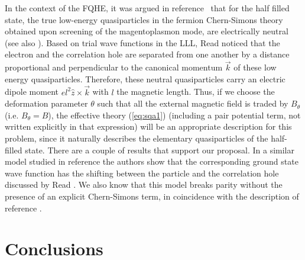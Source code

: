 \documentclass[a4paper,12pt]{article}
\begin{document}
In the context of the FQHE, it was argued in reference~\cite{read}
that for the half filled state, the true low-energy quasiparticles
in
the fermion Chern-Simons theory obtained upon screening of the
magentoplasmon mode, are electrically neutral (see also
\cite{read,ms,hp,dhl,hos}). Based on trial wave functions in the
LLL,
Read noticed that the electron and the correlation hole are
separated
from one another by a distance proportional and perpendicular to
the
canonical momentum $\vec k$ of these low energy quasiparticles.
Therefore, these neutral quasiparticles carry an electric dipole
moment $el^2 {\hat z} \times {\vec k}$ with $l$ the magnetic
length.  Thus,
if we choose the deformation parameter $\theta$ such that all the
external
magnetic field is traded by $B_\theta$ (i.e.  $B_\theta = B$), the
effective
theory (\ref{eq:sqa1}) (including a pair potential term, not
written
explicitly in that expression) will be an appropriate description
for
this problem, since it naturally describes the elementary
quasiparticles of the half-filled state.  There are a couple of
results that support our proposal. In a similar model studied in
reference \cite{wf} the authors show that the corresponding ground
state wave function has the shifting between the particle and the
correlation hole discussed by Read \cite{read}. We also know
\cite{IP}
that this model breaks parity without the presence of an explicit
Chern-Simons term, in coincidence with the description of reference
\cite{read}.

















\section{Conclusions}\label{sec:con}
\end{document}
